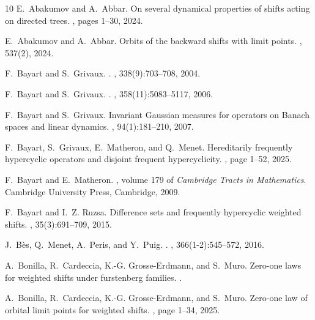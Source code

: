 \documentclass[11pt]{amsart}
\begin{document}
  
\begin{thebibliography}{10}
E.~Abakumov and A.~Abbar.
\newblock On several dynamical properties of shifts acting on directed trees.
, pages 1--30, 2024.

E.~Abakumov and A.~Abbar.
\newblock Orbits of the backward shifts with limit points.
, 537(2),
  2024.

F.~Bayart and S.~Grivaux.
.
, 338(9):703--708, 2004.

F.~{Bayart} and S.~{Grivaux}.
.
, 358(11):5083--5117, 2006.

F.~Bayart and S.~Grivaux.
\newblock Invariant {G}aussian measures for operators on {B}anach spaces and
  linear dynamics.
, 94(1):181--210, 2007.

F.~Bayart, S.~Grivaux, E.~Matheron, and Q.~Menet.
\newblock Hereditarily frequently hypercyclic operators and disjoint frequent
  hypercyclicity.
, page 1–52, 2025.

F.~Bayart and E.~Matheron.
, volume 179 of {\em Cambridge
  Tracts in Mathematics}.
\newblock Cambridge University Press, Cambridge, 2009.

F.~Bayart and I.~Z. Ruzsa.
\newblock Difference sets and frequently hypercyclic weighted shifts.
, 35(3):691--709, 2015.

J.~{B}\`es, Q.~{Menet}, A.~{Peris}, and Y.~{Puig}.
.
, 366(1-2):545--572, 2016.

A.~Bonilla, R.~Cardeccia, K.-G. Grosse-Erdmann, and S.~Muro.
\newblock Zero-one laws for weighted shifts under furstenberg families.
.

A.~Bonilla, R.~Cardeccia, K.-G. Grosse-Erdmann, and S.~Muro.
\newblock Zero-one law of orbital limit points for weighted shifts.
, page 1–34,
  2025.


\end{thebibliography}
\end{document}
